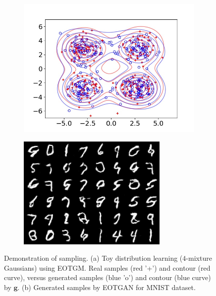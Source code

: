 \begin{figure}[!t]
  \captionsetup[subfigure]{justification=centering}
  \centering
  \begin{subfigure}[b]{0.44\textwidth}
    \centering
    \includegraphics[width=1\linewidth]{images/toy/gauss4/frame8.jpg}
    \caption{}
    \label{fig-toy}
  \end{subfigure}
  \centering
  \begin{subfigure}[b]{0.44\textwidth}
    \centering
    \includegraphics[width=0.85\linewidth]{images/mnist/fake/eot_18500_crop.png}\vspace{5pt}
    \caption{}
    \label{fig-fake-wgan}
  \end{subfigure}
  \caption{Demonstration of sampling. (a) Toy distribution learning ($4$-mixture Gaussians) using EOTGM. Real samples (red '+') and contour
    (red curve), versus generated samples (blue 'o') and contour (blue curve) by $\bm{g}$. (b) Generated samples by EOTGAN for MNIST dataset.}
\end{figure}


